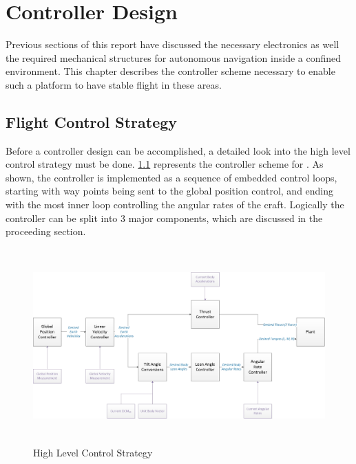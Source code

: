 \chapter{Controller Design}
	Previous sections of this report have discussed the necessary electronics as well the required mechanical structures for autonomous navigation inside a confined environment. This chapter describes the controller scheme necessary to enable such a platform to have stable flight in these areas.

	\section{Flight Control Strategy}
	Before a controller design can be accomplished, a detailed look into the high level control strategy must be done. \ref{IM_ControlStrategy} represents the controller scheme for \projectName. As shown, the controller is implemented as a sequence of embedded control loops, starting with way points being sent to the global position control, and ending with the most inner loop controlling the angular rates of the craft. Logically the controller can be split into 3 major components, which are discussed in the proceeding section. 
	
		\begin{figure}[H]
			\centering
			\includegraphics[height = 7.5cm]{../References/Diagrams/ControlDiagram.jpg}
			\caption{High Level Control Strategy}
			\label{IM_ControlStrategy}
		\end{figure}
		
